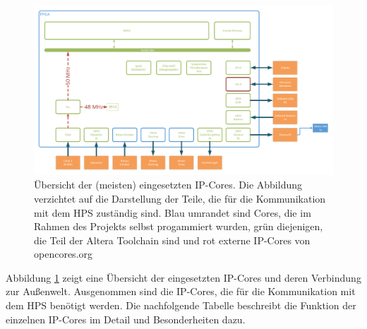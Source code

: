 \begin{figure}
	\includegraphics[angle=90, height=0.9\textheight]{Abb/Garfield_FPGA_Design_only_FPGA.pdf}
	\caption{Übersicht der (meisten) eingesetzten \ac{IP}-Cores. Die Abbildung verzichtet auf die Darstellung der Teile, die für die Kommunikation mit dem \ac{HPS} zuständig sind. Blau umrandet sind Cores, die im Rahmen des Projekts selbst progammiert wurden, grün diejenigen, die Teil der Altera Toolchain sind und rot externe IP-Cores von opencores.org}
	\label{FPGA_IP_FPGA_only}
\end{figure}

Abbildung \ref{FPGA_IP_FPGA_only} zeigt eine Übersicht der eingesetzten \ac{IP}-Cores und deren Verbindung zur Außenwelt. Ausgenommen sind die \ac{IP}-Cores, die für die Kommunikation mit dem \ac{HPS} benötigt werden. Die nachfolgende Tabelle beschreibt die Funktion der einzelnen IP-Cores im Detail und Besonderheiten dazu.

